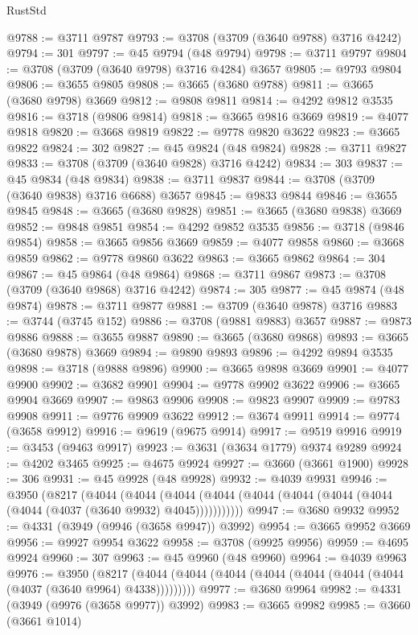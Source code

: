\begin{lexlean}{RustStd}
\begin{coremodule}
@9788 := @3711 @9787
@9793 := @3708 (@3709 (@3640 @9788) @3716 @4242)
@9794 := 301
@9797 := @45 @9794 (@48 @9794)
@9798 := @3711 @9797
@9804 := @3708 (@3709 (@3640 @9798) @3716 @4284) @3657
@9805 := @9793 @9804
@9806 := @3655 @9805
@9808 := @3665 (@3680 @9788)
@9811 := @3665 (@3680 @9798) @3669
@9812 := @9808 @9811
@9814 := @4292 @9812 @3535
@9816 := @3718 (@9806 @9814)
@9818 := @3665 @9816 @3669
@9819 := @4077 @9818
@9820 := @3668 @9819
@9822 := @9778 @9820 @3622
@9823 := @3665 @9822
@9824 := 302
@9827 := @45 @9824 (@48 @9824)
@9828 := @3711 @9827
@9833 := @3708 (@3709 (@3640 @9828) @3716 @4242)
@9834 := 303
@9837 := @45 @9834 (@48 @9834)
@9838 := @3711 @9837
@9844 := @3708 (@3709 (@3640 @9838) @3716 @6688) @3657
@9845 := @9833 @9844
@9846 := @3655 @9845
@9848 := @3665 (@3680 @9828)
@9851 := @3665 (@3680 @9838) @3669
@9852 := @9848 @9851
@9854 := @4292 @9852 @3535
@9856 := @3718 (@9846 @9854)
@9858 := @3665 @9856 @3669
@9859 := @4077 @9858
@9860 := @3668 @9859
@9862 := @9778 @9860 @3622
@9863 := @3665 @9862
@9864 := 304
@9867 := @45 @9864 (@48 @9864)
@9868 := @3711 @9867
@9873 := @3708 (@3709 (@3640 @9868) @3716 @4242)
@9874 := 305
@9877 := @45 @9874 (@48 @9874)
@9878 := @3711 @9877
@9881 := @3709 (@3640 @9878) @3716
@9883 := @3744 (@3745 @152)
@9886 := @3708 (@9881 @9883) @3657
@9887 := @9873 @9886
@9888 := @3655 @9887
@9890 := @3665 (@3680 @9868)
@9893 := @3665 (@3680 @9878) @3669
@9894 := @9890 @9893
@9896 := @4292 @9894 @3535
@9898 := @3718 (@9888 @9896)
@9900 := @3665 @9898 @3669
@9901 := @4077 @9900
@9902 := @3682 @9901
@9904 := @9778 @9902 @3622
@9906 := @3665 @9904 @3669
@9907 := @9863 @9906
@9908 := @9823 @9907
@9909 := @9783 @9908
@9911 := @9776 @9909 @3622
@9912 := @3674 @9911
@9914 := @9774 (@3658 @9912)
@9916 := @9619 (@9675 @9914)
@9917 := @9519 @9916
@9919 := @3453 (@9463 @9917)
@9923 := @3631 (@3634 @1779) @9374 @9289
@9924 := @4202 @3465
@9925 := @4675 @9924
@9927 := @3660 (@3661 @1900)
@9928 := 306
@9931 := @45 @9928 (@48 @9928)
@9932 := @4039 @9931
@9946 := @3950
    (@8217
      (@4044
        (@4044
          (@4044 (@4044 (@4044 (@4044 (@4044 (@4044 (@4044 (@4037 (@3640 @9932) @4045)))))))))))
@9947 := @3680 @9932
@9952 := @4331 (@3949 (@9946 (@3658 @9947)) @3992)
@9954 := @3665 @9952 @3669
@9956 := @9927 @9954 @3622
@9958 := @3708 (@9925 @9956)
@9959 := @4695 @9924
@9960 := 307
@9963 := @45 @9960 (@48 @9960)
@9964 := @4039 @9963
@9976 := @3950
    (@8217 (@4044 (@4044 (@4044 (@4044 (@4044 (@4044 (@4044 (@4037 (@3640 @9964) @4338)))))))))
@9977 := @3680 @9964
@9982 := @4331 (@3949 (@9976 (@3658 @9977)) @3992)
@9983 := @3665 @9982
@9985 := @3660 (@3661 @1014)

\end{coremodule}
\end{lexlean}
